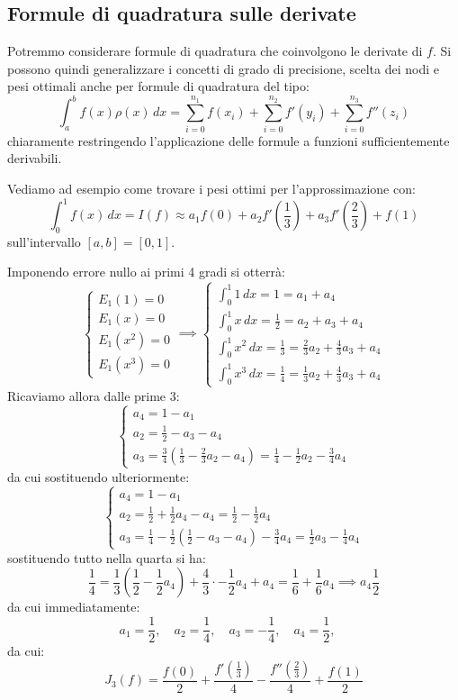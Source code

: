 \documentclass[a4paper,11pt]{article}
\begin{document}
\subsection{Formule di quadratura sulle derivate}
Potremmo considerare formule di quadratura che coinvolgono le derivate di $f$.
Si possono quindi generalizzare i concetti di grado di precisione, scelta dei nodi e pesi ottimali anche per formule di quadratura del tipo:
$$
\int_a^b f(x) \rho(x) \, dx = \sum_{i = 0}^{n_1} f(x_i) + \sum_{i = 0}^{n_2} f'(y_i) + \sum_{i = 0}^{n_3} f''(z_i)
$$
chiaramente restringendo l'applicazione delle formule a funzioni sufficientemente derivabili.

Vediamo ad esempio come trovare i pesi ottimi per l'approssimazione con:
$$
\int_0^1 f(x) \, dx = I(f) \approx a_1 f(0) + a_2 f' \left( \frac{1}{3} \right) + a_3 f' \left( \frac{2}{3} \right) + f(1)
$$
sull'intervallo $[a, b] = [0, 1]$.

Imponendo errore nullo ai primi 4 gradi si otterrà:
\[
	\begin{cases}
		E_1(1)= 0 \\
		E_1(x)= 0 \\
		E_1(x^2)= 0 \\
		E_1(x^3)= 0 
	\end{cases}
	\implies
	\begin{cases}
		\int_0^1 1 \, dx = 1 = a_1 + a_4 \\ 
		\int_0^1 x \, dx = \frac{1}{2} = a_2 + a_3 + a_4 \\
		\int_0^1 x^2 \, dx = \frac{1}{3} = \frac{2}{3} a_2 + \frac{4}{3} a_3 + a_4 \\
		\int_0^1 x^3 \, dx = \frac{1}{4} = \frac{1}{3} a_2 + \frac{4}{3} a_3 + a_4
	\end{cases}
\]
Ricaviamo allora dalle prime 3:
\[
	\begin{cases}
		a_4 = 1 - a_1 \\
		a_2 = \frac{1}{2} - a_3 - a_4 \\ 
		a_3 = \frac{3}{4} \left( \frac{1}{3} - \frac{2}{3} a_2 - a_4 \right) = \frac{1}{4} - \frac{1}{2} a_2 - \frac{3}{4} a_4
\end{cases}
\]
da cui sostituendo ulteriormente:
\[
	\begin{cases}
		a_4 = 1 - a_1 \\ 
		a_2 = \frac{1}{2} + \frac{1}{2} a_4 - a_4 = \frac{1}{2} - \frac{1}{2}a_4 \\ 
		a_3 = \frac{1}{4} - \frac{1}{2} \left( \frac{1}{2} - a_3 - a_4 \right) - \frac{3}{4} a_4 = \frac{1}{2} a_3 - \frac{1}{4}a_4
	\end{cases}
\]
sostituendo tutto nella quarta si ha:
$$
\frac{1}{4} = \frac{1}{3} \left( \frac{1}{2} - \frac{1}{2} a_4 \right) + \frac{4}{3} \cdot - \frac{1}{2} a_4 + a_4 = \frac{1}{6} + \frac{1}{6} a_4 \implies a_4 \frac{1}{2} 
$$
da cui immediatamente:
$$
a_1 = \frac{1}{2}, \quad
a_2 = \frac{1}{4}, \quad
a_3 = -\frac{1}{4}, \quad
a_4 = \frac{1}{2}, \quad
$$
da cui:
$$
J_3(f) = \frac{f(0)}{2} + \frac{f' \left( \frac{1}{3} \right)}{4} - \frac{f'' \left( \frac{2}{3} \right)}{4} + \frac{f(1)}{2}
$$
\end{document}
